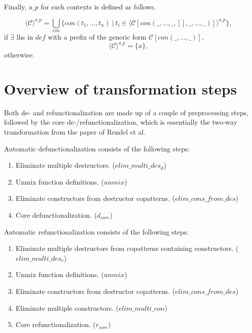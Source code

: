 Finally, $a\_p$ for such contexts is defined as follows.

\begin{equation*}
\langle \mathcal{C} \rangle^{a\_p} = \bigcup_{con} \{con(t_1, ..., t_n) ~ | ~ t_i \in \langle \mathcal{C}[con(\_, ..., \_, [], \_, ..., \_)] \rangle^{a\_p} \},
\end{equation*}
if $\exists$ lhs in $def$ with a prefix of the generic form $\mathcal{C}[con(\_, ..., \_)]$,
\begin{equation*}
\langle \mathcal{C} \rangle^{a\_p} = \{x\},
\end{equation*}
otherwise.

\section{Overview of transformation steps}

Both de- and refunctionalization are made up of a couple of preprocessing steps, followed by the core de-/refunctionalization, which is essentially the two-way transformation from the paper of Rendel et al.

Automatic defunctionalization consists of the following steps:
\begin{enumerate}
\item Eliminate multiple destructors. ($elim\_multi\_des_d$)

\item Unmix function definitions. ($unmix$)

\item Eliminate constructors from destructor copatterns. ($elim\_cons\_from\_des$)

\item Core defunctionalization. ($d_{core}$)

\end{enumerate}

Automatic refunctionalization consists of the following steps:
\begin{enumerate}
\item Eliminate multiple destructors from copatterns containing constructors. ($elim\_multi\_des_r$)

\item Unmix function definitions. ($unmix$)

\item Eliminate constructors from destructor copatterns. ($elim\_cons\_from\_des$)

\item Eliminate multiple constructors. ($elim\_multi\_con$)

\item Core refunctionalization. ($r_{core}$)

\end{enumerate}

